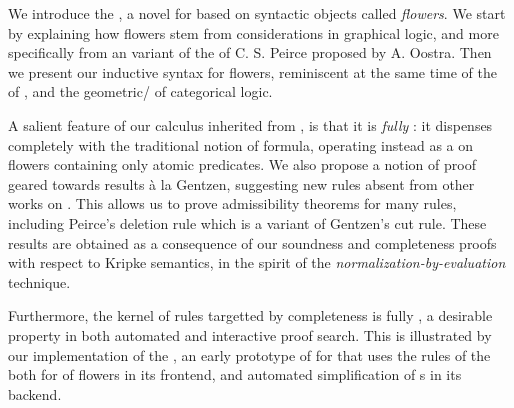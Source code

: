 \begin{scope}


We introduce the \emph{}, a novel  for
  based on syntactic objects called
\emph{flowers}. We start by explaining how flowers stem from considerations in
graphical logic, and more specifically from an  variant of
the  of C. S. Peirce proposed by A. Oostra. Then we
present our inductive syntax for flowers, reminiscent at the same time of the
 of  , and the
geometric/ of categorical logic.

A salient feature of our calculus inherited from , is that it is
\emph{fully }: it dispenses completely with the traditional notion of
 formula, operating instead as a  on flowers
containing only atomic predicates. We also propose a notion of proof geared
towards  results à la Gentzen, suggesting new rules absent from
other works on  . This allows us to prove
admissibility theorems for many rules, including Peirce's deletion rule which is
a variant of Gentzen's cut rule. These results are obtained as a consequence of
our soundness and completeness proofs with respect to Kripke semantics, in the
spirit of the \emph{normalization-by-evaluation} technique.

Furthermore, the kernel of rules targetted by completeness is fully
, a desirable property in both automated and interactive proof
search. This is illustrated by our implementation of the ,
an early prototype of  for  that uses the rules of the  both for  of flowers in its frontend, and
automated simplification of s in its backend.


\end{scope}

